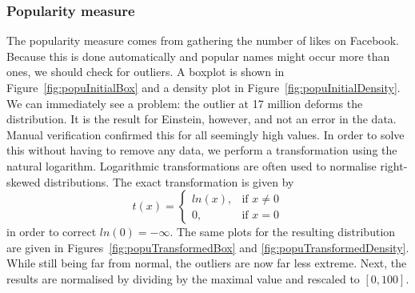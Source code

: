 \subsubsection{Popularity measure}
\label{sssec:popularity}
The popularity measure comes from gathering the number of likes on Facebook. Because this is done automatically and popular names might occur more than ones, we should check for outliers. A boxplot is shown in Figure~\ref{fig:popuInitialBox} and a density plot in Figure~\ref{fig:popuInitialDensity}. We can immediately see a problem: the outlier at 17 million deforms the distribution. It is the result for Einstein, however, and not an error in the data. Manual verification confirmed this for all seemingly high values. In order to solve this without having to remove any data, we perform a transformation using the natural logarithm. Logarithmic transformations are often used to normalise right-skewed distributions. The exact transformation is given by
\begin{equation}
\label{eq:logtransform}
t(x) = \begin{cases} ln(x), & \mbox{if } x \neq 0 \\ 0, & \mbox{if } x = 0 \end{cases}
\end{equation}
in order to correct $ln(0) = -\infty$. The same plots for the resulting distribution are given in Figures~\ref{fig:popuTransformedBox} and \ref{fig:popuTransformedDensity}. While still being far from normal, the outliers are now far less extreme. Next, the results are normalised by dividing by the maximal value and rescaled to $[0, 100]$.

